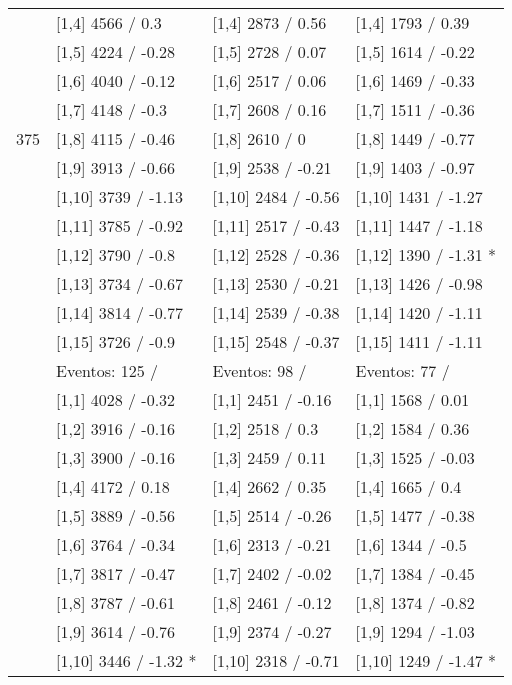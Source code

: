 \begin{table}
\begin{tabular}[t]{llll}
\addlinespace
 & {}[1,4] 4566  / 0.3 & {}[1,4] 2873  / 0.56 & {}[1,4] 1793  / 0.39\\
 & {}[1,5] 4224  / -0.28 & {}[1,5] 2728  / 0.07 & {}[1,5] 1614  / -0.22\\
 & {}[1,6] 4040  / -0.12 & {}[1,6] 2517  / 0.06 & {}[1,6] 1469  / -0.33\\
 & {}[1,7] 4148  / -0.3 & {}[1,7] 2608  / 0.16 & {}[1,7] 1511  / -0.36\\
375 & {}[1,8] 4115  / -0.46 & {}[1,8] 2610  / 0 & {}[1,8] 1449  / -0.77\\
\addlinespace
 & {}[1,9] 3913  / -0.66 & {}[1,9] 2538  / -0.21 & {}[1,9] 1403  / -0.97\\
 & {}[1,10] 3739  / -1.13 & {}[1,10] 2484  / -0.56 & {}[1,10] 1431  / -1.27\\
 & {}[1,11] 3785  / -0.92 & {}[1,11] 2517  / -0.43 & {}[1,11] 1447  / -1.18\\
 & {}[1,12] 3790  / -0.8 & {}[1,12] 2528  / -0.36 & {}[1,12] 1390  / -1.31 *\\
 & {}[1,13] 3734  / -0.67 & {}[1,13] 2530  / -0.21 & {}[1,13] 1426  / -0.98\\
\addlinespace
 & {}[1,14] 3814  / -0.77 & {}[1,14] 2539  / -0.38 & {}[1,14] 1420  / -1.11\\
 & {}[1,15] 3726  / -0.9 & {}[1,15] 2548  / -0.37 & {}[1,15] 1411  / -1.11\\
 & Eventos:  125 / & Eventos:  98 / & Eventos:  77 /\\
 & {}[1,1] 4028  / -0.32 & {}[1,1] 2451  / -0.16 & {}[1,1] 1568  / 0.01\\
 & {}[1,2] 3916  / -0.16 & {}[1,2] 2518  / 0.3 & {}[1,2] 1584  / 0.36\\
\addlinespace
 & {}[1,3] 3900  / -0.16 & {}[1,3] 2459  / 0.11 & {}[1,3] 1525  / -0.03\\
 & {}[1,4] 4172  / 0.18 & {}[1,4] 2662  / 0.35 & {}[1,4] 1665  / 0.4\\
 & {}[1,5] 3889  / -0.56 & {}[1,5] 2514  / -0.26 & {}[1,5] 1477  / -0.38\\
 & {}[1,6] 3764  / -0.34 & {}[1,6] 2313  / -0.21 & {}[1,6] 1344  / -0.5\\
 & {}[1,7] 3817  / -0.47 & {}[1,7] 2402  / -0.02 & {}[1,7] 1384  / -0.45\\
\addlinespace
500 & {}[1,8] 3787  / -0.61 & {}[1,8] 2461  / -0.12 & {}[1,8] 1374  / -0.82\\
 & {}[1,9] 3614  / -0.76 & {}[1,9] 2374  / -0.27 & {}[1,9] 1294  / -1.03\\
 & {}[1,10] 3446  / -1.32 * & {}[1,10] 2318  / -0.71 & {}[1,10] 1249  / -1.47 *\\

\end{tabular}
\end{table}
